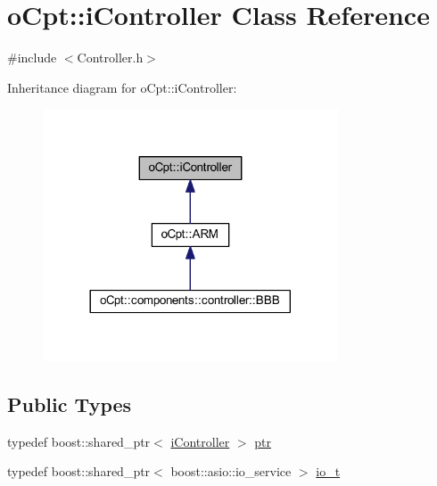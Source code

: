 \hypertarget{classo_cpt_1_1i_controller}{}\section{o\+Cpt\+:\+:i\+Controller Class Reference}
\label{classo_cpt_1_1i_controller}


{\ttfamily \#include $<$Controller.\+h$>$}



Inheritance diagram for o\+Cpt\+:\+:i\+Controller\+:\nopagebreak
\begin{figure}[H]
\begin{center}
\leavevmode
\includegraphics[width=248pt]{classo_cpt_1_1i_controller__inherit__graph}
\end{center}
\end{figure}
\subsection*{Public Types}
\begin{DoxyCompactItemize}
\item 
typedef boost\+::shared\+\_\+ptr$<$ \hyperlink{classo_cpt_1_1i_controller}{i\+Controller} $>$ \hyperlink{classo_cpt_1_1i_controller_a6d89a95cd6ad68bb74adfaca2f36370f}{ptr}
\item 
typedef boost\+::shared\+\_\+ptr$<$ boost\+::asio\+::io\+\_\+service $>$ \hyperlink{classo_cpt_1_1i_controller_a51c3436b03060209f6cd2ddce6df2d0c}{io\+\_\+t}
\end{DoxyCompactItemize}
